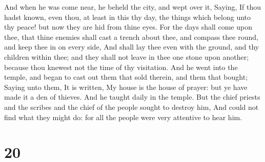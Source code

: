  And when he was come near, he beheld the city, and wept
over it,  Saying, If thou hadst known, even thou, at
least in this thy day, the things which belong unto thy peace! but now
they are hid from thine eyes.  For the days shall come
upon thee, that thine enemies shall cast a trench about thee, and
compass thee round, and keep thee in on every side,  And
shall lay thee even with the ground, and thy children within thee; and
they shall not leave in thee one stone upon another; because thou
knewest not the time of thy visitation.  And he went into
the temple, and began to cast out them that sold therein, and them that
bought;  Saying unto them, It is written, My house is the
house of prayer: but ye have made it a den of thieves. 
And he taught daily in the temple. But the chief priests and the scribes
and the chief of the people sought to destroy him,  And
could not find what they might do: for all the people were very
attentive to hear him.

\hypertarget{section-19}{%
\section{20}\label{section-19}}

